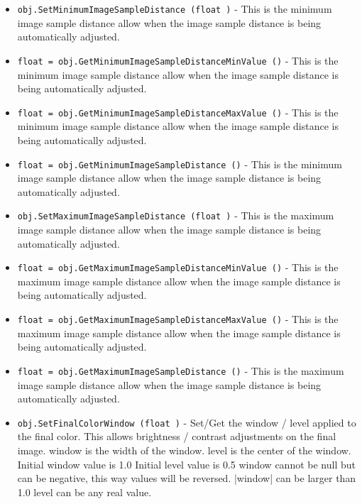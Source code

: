 \begin{itemize}
\item  \verb|obj.SetMinimumImageSampleDistance (float )| -  This is the minimum image sample distance allow when the image
 sample distance is being automatically adjusted.

\item  \verb|float = obj.GetMinimumImageSampleDistanceMinValue ()| -  This is the minimum image sample distance allow when the image
 sample distance is being automatically adjusted.

\item  \verb|float = obj.GetMinimumImageSampleDistanceMaxValue ()| -  This is the minimum image sample distance allow when the image
 sample distance is being automatically adjusted.

\item  \verb|float = obj.GetMinimumImageSampleDistance ()| -  This is the minimum image sample distance allow when the image
 sample distance is being automatically adjusted.

\item  \verb|obj.SetMaximumImageSampleDistance (float )| -  This is the maximum image sample distance allow when the image
 sample distance is being automatically adjusted.

\item  \verb|float = obj.GetMaximumImageSampleDistanceMinValue ()| -  This is the maximum image sample distance allow when the image
 sample distance is being automatically adjusted.

\item  \verb|float = obj.GetMaximumImageSampleDistanceMaxValue ()| -  This is the maximum image sample distance allow when the image
 sample distance is being automatically adjusted.

\item  \verb|float = obj.GetMaximumImageSampleDistance ()| -  This is the maximum image sample distance allow when the image
 sample distance is being automatically adjusted.

\item  \verb|obj.SetFinalColorWindow (float )| -  Set/Get the window / level applied to the final color.
 This allows brightness / contrast adjustments on the
 final image.
 window is the width of the window.
 level is the center of the window.
 Initial window value is 1.0
 Initial level value is 0.5
 window cannot be null but can be negative, this way
 values will be reversed.
 |window| can be larger than 1.0
 level can be any real value.


\end{itemize}
